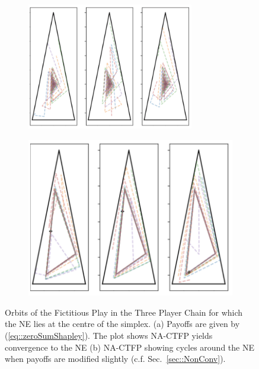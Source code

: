 \documentclass{article}
\theoremstyle{definition}
\begin{document}
  \begin{figure}[t]
    \centering
    \begin{subfigure}[b]{0.45 \textwidth}
      \includegraphics[width = 0.8\textwidth]{Figures/convergentShapley.png}
    \caption{\label{fig::convergentShapley}}
    \end{subfigure}
    \begin{subfigure}[b]{0.45 \textwidth}
      \includegraphics[width = 0.8 \textwidth]{Figures/nonConvergentShapley.png}
      \caption{\label{fig::nonconvergentShapley}}
    \end{subfigure}
    \caption{\label{fig::Shapley} Orbits of the Fictitious Play in the Three Player Chain for which the NE lies at the centre of the simplex. (a) Payoffs are given by
    (\ref{eq::zeroSumShapley}). The plot shows NA-CTFP yields convergence to the NE (b)
	NA-CTFP showing cycles around the NE when payoffs are modified slightly (c.f. Sec.~\ref{sec::NonConv}).}
  \end{figure}
\end{document}
